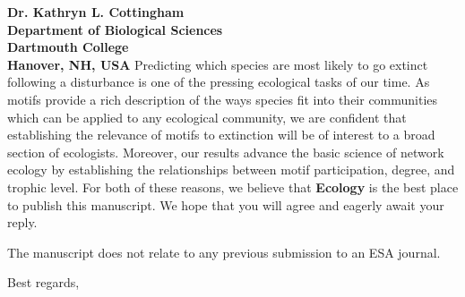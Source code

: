 \documentclass[12pt]{letter}
\begin{document}
\begin{letter}{\bf Dr. Kathryn L. Cottingham \\
Department of Biological Sciences \\
Dartmouth College \\
Hanover, NH, USA}
 	Predicting which species are most likely to go extinct following a disturbance is one of the pressing ecological tasks of our time. 
 	As motifs provide a rich description of the ways species fit into their communities which can be applied to any ecological community, we are confident that establishing the relevance of motifs to extinction will be of interest to a broad section of ecologists.
 	Moreover, our results advance the basic science of network ecology by establishing the relationships between motif participation, degree, and trophic level. 
 	For both of these reasons, we believe that \textbf{Ecology} is the best place to publish this manuscript. 
 	We hope that you will agree and eagerly await your reply.


	The manuscript does not relate to any previous submission to an ESA journal. 

\closing{Best regards,}



\end{letter}
\end{document}
